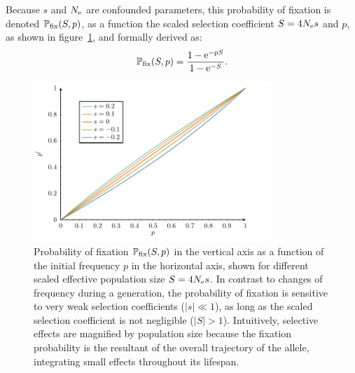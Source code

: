 Because $s$ and $N_{\text{e}}$ are confounded parameters, this probability of fixation is denoted $\mathbb{P}_{\text{fix}}(S, p)$, as a function the scaled selection coefficient $S = 4 N_{\text{e}} s$ and $p$, as shown in figure~\ref{fig:pfix-p}, and formally derived as:
\begin{equation}
\mathbb{P}_{\text{fix}}(S, p) = \dfrac{1 - \text{e}^{- p S }}{1 - \text{e}^{-S}}.
\end{equation}


\begin{figure}[H]
    \centering
    \includegraphics[width=0.8\textwidth, page=3] {figures.pdf}
    \caption[Probability of fixation]{
    Probability of fixation $\mathbb{P}_{\text{fix}}(S, p)$ in the vertical axis as a function of the initial frequency $p$ in the horizontal axis, shown for different scaled effective population size $S=4 N_{\text{e}} s$.
    In contrast to changes of frequency during a generation, the probability of fixation is sensitive to very weak selection coefficients ($|s| \ll 1$), as long as the scaled selection coefficient is not negligible ($|S| > 1$).
    Intuitively, selective effects are magnified by population size because the fixation probability is the resultant of the overall trajectory of the allele, integrating small effects throughout its lifespan. }
\label{fig:pfix-p}
\end{figure}


